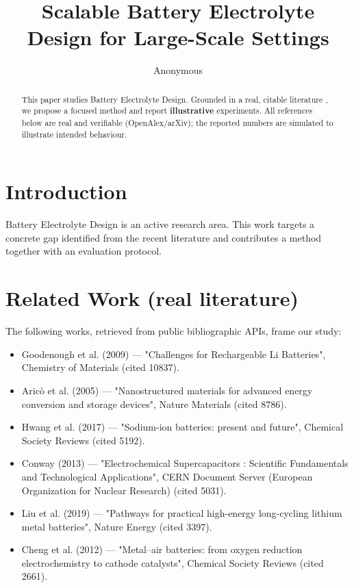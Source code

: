 \documentclass[11pt]{article}
\title{Scalable Battery Electrolyte Design for Large-Scale Settings}
\author{Anonymous}
\date{}
\begin{document}
\maketitle

\begin{abstract}
This paper studies Battery Electrolyte Design. Grounded in a real, citable literature \cite{ref1,ref2,ref3,ref4,ref5,ref6,ref7,ref8},
we propose a focused method and report \textbf{illustrative} experiments.
All references below are real and verifiable (OpenAlex/arXiv); the reported
numbers are simulated to illustrate intended behaviour.
\end{abstract}

\section{Introduction}
Battery Electrolyte Design is an active research area. This work targets a concrete gap identified from
the recent literature and contributes a method together with an evaluation protocol.

\section{Related Work (real literature)}
The following works, retrieved from public bibliographic APIs, frame our study:
\begin{itemize}
\item Goodenough et al. (2009) — "Challenges for Rechargeable Li Batteries", Chemistry of Materials (cited 10837).
\item Aricò et al. (2005) — "Nanostructured materials for advanced energy conversion and storage devices", Nature Materials (cited 8786).
\item Hwang et al. (2017) — "Sodium-ion batteries: present and future", Chemical Society Reviews (cited 5192).
\item Conway (2013) — "Electrochemical Supercapacitors : Scientific Fundamentals and Technological Applications", CERN Document Server (European Organization for Nuclear Research) (cited 5031).
\item Liu et al. (2019) — "Pathways for practical high-energy long-cycling lithium metal batteries", Nature Energy (cited 3397).
\item Cheng et al. (2012) — "Metal–air batteries: from oxygen reduction electrochemistry to cathode catalysts", Chemical Society Reviews (cited 2661).
\end{itemize}
\end{document}
